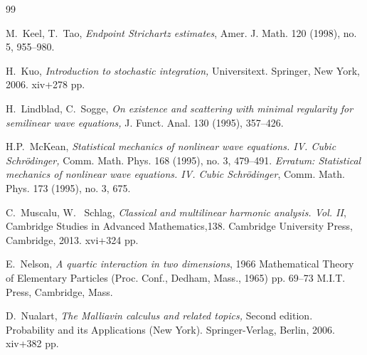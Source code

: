 \documentclass[letterpaper, 11pt,  reqno]{amsart}
\newcommand{\1}{\hspace{0.5mm}\text{I}\hspace{0.5mm}}
\numberwithin{equation}{section}
\numberwithin{theorem}{section}
\begin{document}
\begin{thebibliography}{99}



M.~Keel, T.~Tao, {\it Endpoint Strichartz estimates},  Amer. J. Math. 120 (1998), no. 5, 955--980.


H.~Kuo, 
{\it Introduction to stochastic integration,} Universitext. Springer, New York, 2006. xiv+278 pp.






H.~Lindblad, C.~Sogge, {\it On existence and scattering with minimal regularity for semilinear wave equations,} J. Funct. Anal. 130 (1995), 357--426.




H.P.~McKean, 
{\it Statistical mechanics of nonlinear wave equations. IV. Cubic Schr\"odinger,} 
 Comm. Math. Phys. 168 (1995), no. 3, 479--491. 
 {\it Erratum: Statistical mechanics of nonlinear wave equations. IV. Cubic Schr\"odinger}, Comm. Math. Phys. 173 (1995), no. 3, 675.



C.~Muscalu, W.~ Schlag,
 {\it Classical and multilinear harmonic analysis. {V}ol. {II}},
 Cambridge Studies in Advanced Mathematics,138. Cambridge University Press, Cambridge, 2013. 
xvi+324 pp. 


E.~Nelson, 
{\it A quartic interaction in two dimensions}, 
 1966 Mathematical Theory of Elementary Particles (Proc. Conf., Dedham, Mass., 1965) pp. 69--73 M.I.T. Press, Cambridge, Mass.



D.~Nualart, 
{\it The Malliavin calculus and related topics,} Second edition. Probability and its Applications (New York). Springer-Verlag, Berlin, 2006. xiv+382 pp.





\end{thebibliography}
\end{document}
